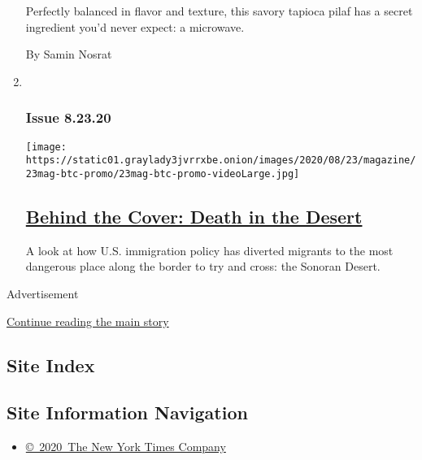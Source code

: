 \begin{enumerate}
  Perfectly balanced in flavor and texture, this savory tapioca pilaf
  has a secret ingredient you'd never expect: a microwave.

  By Samin Nosrat
\item ~
  \hypertarget{issue-82320}{%
  \subsubsection{Issue 8.23.20}\label{issue-82320}}

  \texttt{[image: https://static01.graylady3jvrrxbe.onion/images/2020/08/23/magazine/23mag-btc-promo/23mag-btc-promo-videoLarge.jpg]}

  \hypertarget{behind-the-cover-death-in-the-desert}{%
  \subsection{\texorpdfstring{\href{/2020/08/21/magazine/behind-the-cover-death-in-the-desert.html}{Behind
  the Cover: Death in the
  Desert}}{Behind the Cover: Death in the Desert}}\label{behind-the-cover-death-in-the-desert}}

  A look at how U.S. immigration policy has diverted migrants to the
  most dangerous place along the border to try and cross: the Sonoran
  Desert.
\end{enumerate}

Advertisement

\protect\hyperlink{after-mid1}{Continue reading the main story}

\hypertarget{site-index}{%
\subsection{Site Index}\label{site-index}}

\hypertarget{site-information-navigation}{%
\subsection{Site Information
Navigation}\label{site-information-navigation}}

\begin{itemize}
\tightlist
\item
  \href{https://help.nytimes3xbfgragh.onion/hc/en-us/articles/115014792127-Copyright-notice}{©~2020~The
  New York Times Company}
\end{itemize}


